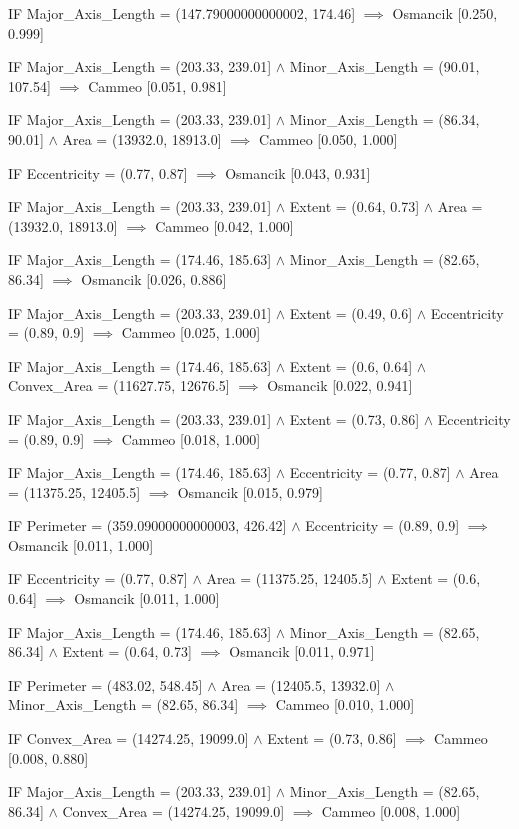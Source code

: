 IF Major\_Axis\_Length = (147.79000000000002, 174.46] $\implies$ Osmancik [0.250, 0.999]

IF Major\_Axis\_Length = (203.33, 239.01] $\land$ Minor\_Axis\_Length = (90.01, 107.54] $\implies$ Cammeo [0.051, 0.981]

IF Major\_Axis\_Length = (203.33, 239.01] $\land$ Minor\_Axis\_Length = (86.34, 90.01] $\land$ Area = (13932.0, 18913.0] $\implies$ Cammeo [0.050, 1.000]

IF Eccentricity = (0.77, 0.87] $\implies$ Osmancik [0.043, 0.931]

IF Major\_Axis\_Length = (203.33, 239.01] $\land$ Extent = (0.64, 0.73] $\land$ Area = (13932.0, 18913.0] $\implies$ Cammeo [0.042, 1.000]

IF Major\_Axis\_Length = (174.46, 185.63] $\land$ Minor\_Axis\_Length = (82.65, 86.34] $\implies$ Osmancik [0.026, 0.886]

IF Major\_Axis\_Length = (203.33, 239.01] $\land$ Extent = (0.49, 0.6] $\land$ Eccentricity = (0.89, 0.9] $\implies$ Cammeo [0.025, 1.000]

IF Major\_Axis\_Length = (174.46, 185.63] $\land$ Extent = (0.6, 0.64] $\land$ Convex\_Area = (11627.75, 12676.5] $\implies$ Osmancik [0.022, 0.941]

IF Major\_Axis\_Length = (203.33, 239.01] $\land$ Extent = (0.73, 0.86] $\land$ Eccentricity = (0.89, 0.9] $\implies$ Cammeo [0.018, 1.000]

IF Major\_Axis\_Length = (174.46, 185.63] $\land$ Eccentricity = (0.77, 0.87] $\land$ Area = (11375.25, 12405.5] $\implies$ Osmancik [0.015, 0.979]

IF Perimeter = (359.09000000000003, 426.42] $\land$ Eccentricity = (0.89, 0.9] $\implies$ Osmancik [0.011, 1.000]

IF Eccentricity = (0.77, 0.87] $\land$ Area = (11375.25, 12405.5] $\land$ Extent = (0.6, 0.64] $\implies$ Osmancik [0.011, 1.000]

IF Major\_Axis\_Length = (174.46, 185.63] $\land$ Minor\_Axis\_Length = (82.65, 86.34] $\land$ Extent = (0.64, 0.73] $\implies$ Osmancik [0.011, 0.971]

IF Perimeter = (483.02, 548.45] $\land$ Area = (12405.5, 13932.0] $\land$ Minor\_Axis\_Length = (82.65, 86.34] $\implies$ Cammeo [0.010, 1.000]

IF Convex\_Area = (14274.25, 19099.0] $\land$ Extent = (0.73, 0.86] $\implies$ Cammeo [0.008, 0.880]

IF Major\_Axis\_Length = (203.33, 239.01] $\land$ Minor\_Axis\_Length = (82.65, 86.34] $\land$ Convex\_Area = (14274.25, 19099.0] $\implies$ Cammeo [0.008, 1.000]

